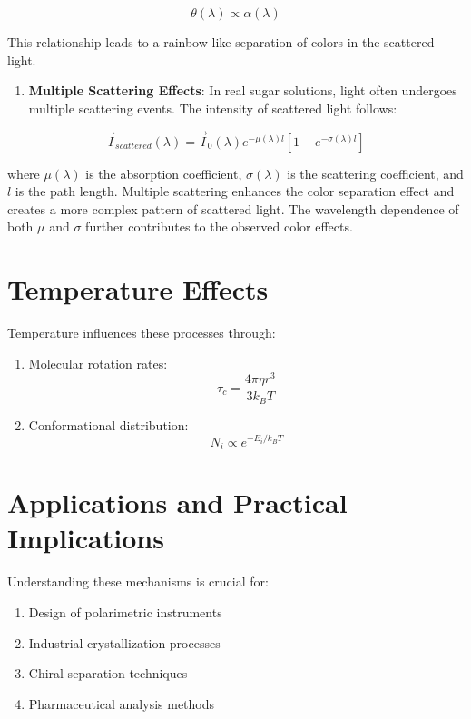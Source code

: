 \documentclass[
  a4paper,
]{book}
\providecommand{\tightlist}{%
  \setlength{\itemsep}{0pt}\setlength{\parskip}{0pt}}
\begin{document}
\[\theta(\lambda) \propto \alpha(\lambda)\]

This relationship leads to a rainbow-like separation of colors in the
scattered light.

\begin{enumerate}
\def\labelenumi{\arabic{enumi}.}
\setcounter{enumi}{2}
\tightlist
\item
  \textbf{Multiple Scattering Effects}: In real sugar solutions, light
  often undergoes multiple scattering events. The intensity of scattered
  light follows:
\end{enumerate}

\[\vec{I}_{scattered}(\lambda) = \vec{I}_0(\lambda)e^{-\mu(\lambda)l}[1 - e^{-\sigma(\lambda)l}]\]

where \(\mu(\lambda)\) is the absorption coefficient,
\(\sigma(\lambda)\) is the scattering coefficient, and \(l\) is the path
length. Multiple scattering enhances the color separation effect and
creates a more complex pattern of scattered light. The wavelength
dependence of both \(\mu\) and \(\sigma\) further contributes to the
observed color effects.

\section{Temperature Effects}\label{temperature-effects}

Temperature influences these processes through:

\begin{enumerate}
\def\labelenumi{\arabic{enumi}.}
\item
  Molecular rotation rates: \[\tau_c = \frac{4\pi\eta r^3}{3k_BT}\]
\item
  Conformational distribution: \[N_i \propto e^{-E_i/k_BT}\]
\end{enumerate}

\section{Applications and Practical
Implications}\label{applications-and-practical-implications}

Understanding these mechanisms is crucial for:

\begin{enumerate}
\def\labelenumi{\arabic{enumi}.}
\tightlist
\item
  Design of polarimetric instruments
\item
  Industrial crystallization processes
\item
  Chiral separation techniques
\item
  Pharmaceutical analysis methods
\end{enumerate}
\end{document}
